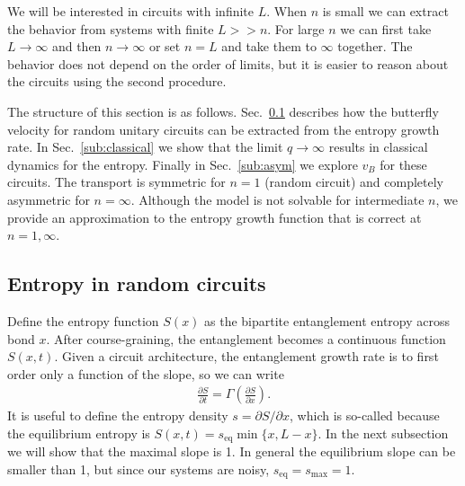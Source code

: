 \documentclass[aps,prx,reprint,superscriptaddress, longbibliography]{revtex4-1}
\begin{document}
We will be interested in circuits with infinite $L$. When $n$ is small we can extract the behavior from systems with finite $L>>n$. For large $n$ we can first take $L\to\infty$ and then $n\to\infty$ or set $n=L$ and take them to $\infty$ together. The behavior does not depend on the order of limits, but it is easier to reason about the circuits using the second procedure.

The structure of this section is as follows. Sec.~\ref{sub:entropy} describes how the butterfly velocity for random unitary circuits can be extracted from the entropy growth rate. In Sec.~\ref{sub:classical} we show that the limit $q\to\infty$ results in classical dynamics for the entropy. Finally in Sec.~\ref{sub:asym} we explore $v_B$ for these circuits. The transport is symmetric for $n=1$ (random circuit) and completely asymmetric for $n=\infty$. Although the model is not solvable for intermediate $n$, we provide an approximation to the entropy growth function that is correct at $n=1, \infty$.

\subsection{Entropy in random circuits} \label{sub:entropy}


Define the entropy function $S(x)$ as the bipartite entanglement entropy across bond $x$. 
After course-graining, the entanglement becomes a continuous function $S(x,t)$. Given a circuit architecture, the entanglement growth rate is to first order only a function of the slope, so we can write \cite{Jonay}
\begin{align}
\frac{\partial S}{\partial t} = \Gamma\left(\frac{\partial S}{\partial x}\right).
\end{align}
It is useful to define the entropy density $s = \partial S / \partial x$, which is so-called because the equilibrium entropy is $S(x, t) = s_\text{eq} \min\{x, L - x\}$.  In the next subsection we will show that the maximal slope is 1. In general the equilibrium slope can be smaller than 1, but since our systems are noisy, $s_\text{eq} = s_\text{max} = 1$.
\end{document}
